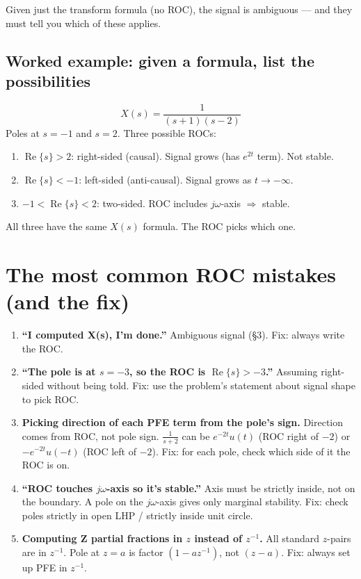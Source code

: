 \documentclass[11pt]{article}
\begin{document}
Given just the transform formula (no ROC), the signal is ambiguous --- and they must tell you which of these applies.

\subsection{Worked example: given a formula, list the possibilities}

\[
X(s) = \frac{1}{(s+1)(s-2)}
\]
Poles at $s = -1$ and $s = 2$. Three possible ROCs:
\begin{enumerate}
  \item $\operatorname{Re}\{s\} > 2$: right-sided (causal). Signal grows (has $e^{2t}$ term). Not stable.
  \item $\operatorname{Re}\{s\} < -1$: left-sided (anti-causal). Signal grows as $t \to -\infty$.
  \item $-1 < \operatorname{Re}\{s\} < 2$: two-sided. ROC includes $j\omega$-axis $\Rightarrow$ stable.
\end{enumerate}
All three have the same $X(s)$ formula. The ROC picks which one.

\section{The most common ROC mistakes (and the fix)}

\begin{enumerate}
  \item \textbf{``I computed X(s), I'm done.''} Ambiguous signal (\S3). Fix: always write the ROC.
  \item \textbf{``The pole is at $s=-3$, so the ROC is $\operatorname{Re}\{s\} > -3$.''} Assuming right-sided without being told. Fix: use the problem's statement about signal shape to pick ROC.
  \item \textbf{Picking direction of each PFE term from the pole's sign.} Direction comes from ROC, not pole sign. $\tfrac{1}{s+2}$ can be $e^{-2t}u(t)$ (ROC right of $-2$) or $-e^{-2t}u(-t)$ (ROC left of $-2$). Fix: for each pole, check which side of it the ROC is on.
  \item \textbf{``ROC touches $j\omega$-axis so it's stable.''} Axis must be strictly inside, not on the boundary. A pole on the $j\omega$-axis gives only marginal stability. Fix: check poles strictly in open LHP / strictly inside unit circle.
  \item \textbf{Computing Z partial fractions in $z$ instead of $z^{-1}$.} All standard $z$-pairs are in $z^{-1}$. Pole at $z=a$ is factor $(1-az^{-1})$, not $(z-a)$. Fix: always set up PFE in $z^{-1}$.
\end{enumerate}
\end{document}
